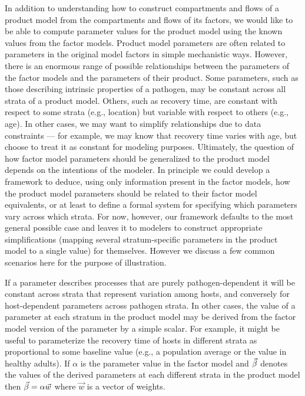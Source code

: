 In addition to understanding how to construct compartments and flows of a product model from the compartments and flows of its factors, we would like to be able to compute parameter values for the product model using the known values from the factor models.
Product model parameters are often related to parameters in the original model factors in simple mechanistic ways. However, there is an enormous range of possible relationships between the parameters of the factor models and the parameters of their product.
Some parameters, such as those describing intrinsic properties of a pathogen, may be constant across all strata of a product model. Others, such as recovery time, are constant with respect to some strata (e.g., location) but variable with respect to others (e.g., age). In other cases, we may want to simplify relationships due to data constraints --- for example, we may know that recovery time varies with age, but choose to treat it as constant for modeling purposes. Ultimately, the question of how factor model parameters should be generalized to the product model depends on the intentions of the modeler. In principle we could develop a framework to deduce, using only information present in the factor models, how the product model parameters should be related to their factor model equivalents, or at least to define a formal system for specifying which parameters vary across which strata. For now, however, our framework defaults to the most general possible case and leaves it to modelers to construct appropriate simplifications (mapping several stratum-specific parameters in the product model to a single value) for themselves. However we discuss a few common scenarios here for the purpose of illustration. 

If a parameter describes processes that are purely pathogen-dependent it will be constant across strata that represent variation among hosts, and conversely for host-dependent parameters across pathogen strata.
In other cases, the value of a parameter at each stratum in the product model may be derived from the factor model version of the parameter by a simple scalar. For example, it might be useful to parameterize the recovery time of hosts in different strata as proportional to some baseline value (e.g., a population average or the value in healthy adults). If $\alpha$ is the parameter value in the factor model and $\vec{\beta}$ denotes the values of the derived parameters at each different strata in the product model then $\vec{\beta} = \alpha\vec{w}$ where $\vec{w}$ is a vector of weights.

